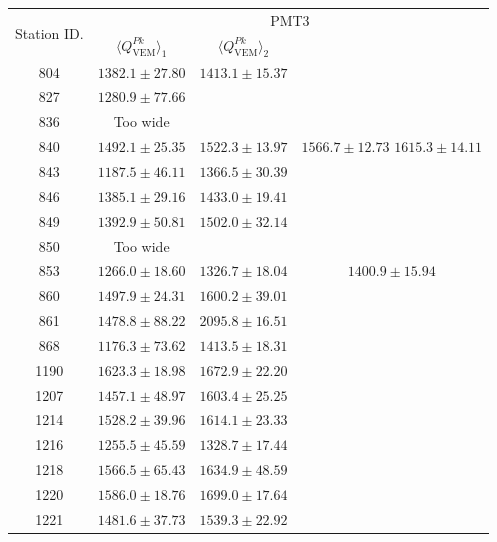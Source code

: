 \documentclass[aspectratio=169]{beamer}
\begin{document}
\begin{frame}
  \footnotesize
  \begin{tabular}{c|c|c|c} \hline
    \multirow{2}{*}{Station ID.} & \multicolumn{3}{c}{PMT3} \\
    \cline{2-4}
     & $\langle Q^{Pk}_{\mathrm{VEM}} \rangle_1$ & 
     $\langle Q^{Pk}_{\mathrm{VEM}} \rangle_2$ &  \\
     \cline{1-4}
     804  & $1382.1\pm27.80$ & $1413.1\pm15.37$ & 
     \\ \hline
     827  & $1280.9\pm77.66$ & & 
     \\ \hline
     836 & Too wide & & 
     \\ \hline
     840  & $1492.1\pm25.35$ & $1522.3\pm13.97$ &
     $1566.7\pm12.73$\,\,$1615.3\pm14.11$
     \\ \hline
     843  & $1187.5\pm46.11$ & $1366.5\pm30.39$ &
     \\ \hline
     846  & $1385.1\pm29.16$ & $1433.0\pm19.41$ &
     \\ \hline
     849  & $1392.9\pm50.81$ & $1502.0\pm32.14$ & 
     \\ \hline 
     850  & Too wide & & 
     \\ \hline
     853  & $1266.0\pm18.60$ & $1326.7\pm18.04$ &
     $1400.9\pm15.94$
     \\ \hline
     860  & $1497.9\pm24.31$ & $1600.2\pm39.01$ &
     \\ \hline
     861  & $1478.8\pm88.22$ & $2095.8\pm16.51$ &
     \\ \hline
     868  & $1176.3\pm73.62$ & $1413.5\pm18.31$ &
     \\ \hline
     1190 & $1623.3\pm18.98$ & $1672.9\pm22.20$ &
     \\ \hline
     1207 & $1457.1\pm48.97$ & $1603.4\pm25.25$ & 
     \\ \hline
     1214 & $1528.2\pm39.96$ & $1614.1\pm23.33$ &
     \\ \hline
     1216 & $1255.5\pm45.59$ & $1328.7\pm17.44$ &
     \\ \hline
     1218 & $1566.5\pm65.43$ & $1634.9\pm48.59$ &
     \\ \hline
     1220 & $1586.0\pm18.76$ & $1699.0\pm17.64$ & 
     \\ \hline
     1221 & $1481.6\pm37.73$ & $1539.3\pm22.92$ &
     \\ \hline
  \end{tabular}
\end{frame}
\end{document}
